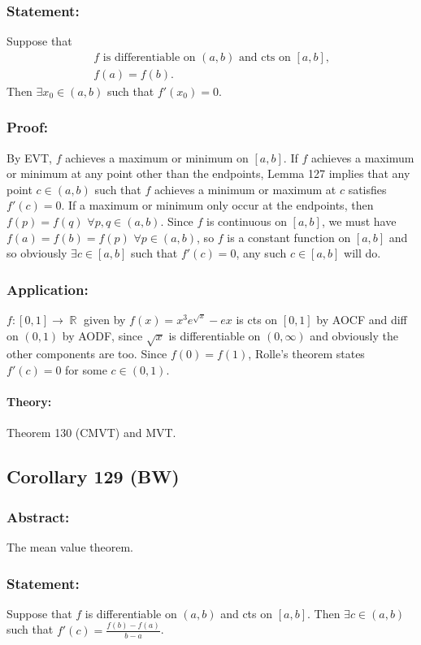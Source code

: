 \documentclass{article}
\DeclareMathOperator\R{\mathbb{R}}
\begin{document}
\subsubsection*{Statement:}
Suppose that \begin{gather}
\text{$f$ is differentiable on $(a,b)$ and cts on $[a,b]$,} \\
f(a) = f(b).
\end{gather}
Then $\exists x_0 \in (a,b)$ such that $f'(x_0) = 0$.
\subsubsection*{Proof:}
By EVT, $f$ achieves a maximum or minimum on $[a,b]$. If $f$ achieves a maximum or minimum at any point other than the endpoints,
Lemma 127 implies that any point $c \in (a,b)$ such that $f$ achieves
a minimum or maximum at $c$
satisfies $f'(c) = 0$. If a maximum or minimum only occur at the endpoints, then
$f(p)= f(q) \,\, \forall p,q \in (a,b)$. Since $f$ is continuous on $[a,b]$, we must have
$f(a)=f(b) = f(p) \,\, \forall p \in (a,b)$, so $f$ is a constant function on $[a,b]$ and so obviously
$\exists c \in [a,b]$ such that $f'(c) = 0$, any such $c \in [a,b]$ will do.
\subsubsection*{Application:}
$f:[0,1] \to \R$ given by $f(x) = x^3e^{\sqrt{x}}-ex$
is cts on $[0,1]$ by AOCF and diff on $(0,1)$ by AODF, since $\sqrt{x}$
is differentiable on $(0, \infty)$ and obviously the other components are too.
Since $f(0) = f(1)$, Rolle's theorem states $f'(c) = 0$ for some $c \in (0,1)$.
\paragraph{Theory:}
Theorem 130 (CMVT) and MVT.
\subsection{Corollary 129 (BW)}
\subsubsection*{Abstract:}
The mean value theorem.
\subsubsection*{Statement:}
Suppose that $f$ is differentiable on $(a,b)$ and cts on $[a,b]$. Then
$\exists c \in (a,b)$ such that $f'(c) = \frac{f(b)-f(a)}{b-a}$.
\end{document}
